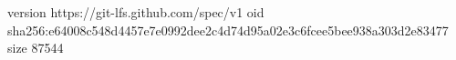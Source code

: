 version https://git-lfs.github.com/spec/v1
oid sha256:e64008c548d4457e7e0992dee2c4d74d95a02e3c6fcee5bee938a303d2e83477
size 87544
